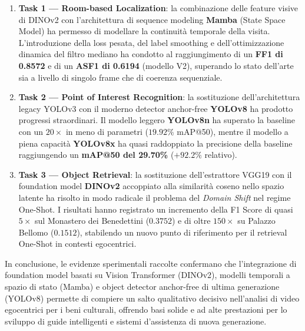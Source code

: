 \documentclass[a4paper,12pt]{report}
\begin{document}
\begin{enumerate}
    \item \textbf{Task 1 --- Room-based Localization}: la combinazione delle feature visive di DINOv2 con l'architettura di sequence modeling \textbf{Mamba} (State Space Model) ha permesso di modellare la continuità temporale della visita. L'introduzione della loss pesata, del label smoothing e dell'ottimizzazione dinamica del filtro mediano ha condotto al raggiungimento di un \textbf{FF1 di 0.8572} e di un \textbf{ASF1 di 0.6194} (modello V2), superando lo stato dell'arte sia a livello di singolo frame che di coerenza sequenziale.
    
    \item \textbf{Task 2 --- Point of Interest Recognition}: la sostituzione dell'architettura legacy YOLOv3 con il moderno detector anchor-free \textbf{YOLOv8} ha prodotto progressi straordinari. Il modello leggero \textbf{YOLOv8n} ha superato la baseline con un $20\times$ in meno di parametri ($19.92\%$ mAP@50), mentre il modello a piena capacità \textbf{YOLOv8x} ha quasi raddoppiato la precisione della baseline raggiungendo un \textbf{mAP@50 del 29.70\%} ($+92.2\%$ relativo).
    
    \item \textbf{Task 3 --- Object Retrieval}: la sostituzione dell'estrattore VGG19 con il foundation model \textbf{DINOv2} accoppiato alla similarità coseno nello spazio latente ha risolto in modo radicale il problema del \emph{Domain Shift} nel regime One-Shot. I risultati hanno registrato un incremento della F1 Score di quasi $5\times$ sul Monastero dei Benedettini ($0.3752$) e di oltre \textbf{$150\times$} su Palazzo Bellomo ($0.1512$), stabilendo un nuovo punto di riferimento per il retrieval One-Shot in contesti egocentrici.
\end{enumerate}

In conclusione, le evidenze sperimentali raccolte confermano che l'integrazione di foundation model basati su Vision Transformer (DINOv2), modelli temporali a spazio di stato (Mamba) e object detector anchor-free di ultima generazione (YOLOv8) permette di compiere un salto qualitativo decisivo nell'analisi di video egocentrici per i beni culturali, offrendo basi solide e ad alte prestazioni per lo sviluppo di guide intelligenti e sistemi d'assistenza di nuova generazione.
\end{document}
